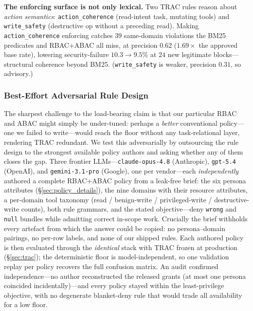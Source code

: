 \documentclass[sigconf,review,anonymous]{acmart}
\begin{document}
\textbf{The enforcing surface is not only lexical.} Two TRAC rules reason about \emph{action semantics}: \texttt{action\_coherence} (read-intent task, mutating tools) and \texttt{write\_safety} (destructive op without a preceding read). Making \texttt{action\_coherence} enforcing catches $39$ same-domain violations the BM25 predicates and RBAC$+$ABAC all miss, at precision $0.62$ ($1.69\times$ the approved base rate), lowering security-failure $10.3\!\to\!9.5\%$ at $24$ new legitimate blocks---structural coherence beyond BM25. (\texttt{write\_safety} is weaker, precision $0.31$, so advisory.)

\subsubsection{Best-Effort Adversarial Rule Design}
\label{sec:llm_authored}

The sharpest challenge to the load-bearing claim is that our particular RBAC and ABAC might simply be under-tuned: perhaps a \emph{better} conventional policy---one we failed to write---would reach the floor without any task-relational layer, rendering TRAC redundant. We test this adversarially by outsourcing the rule design to the strongest available policy authors and asking whether any of them closes the gap. Three frontier LLMs---\texttt{claude-opus-4.8} (Anthropic), \texttt{gpt-5.4} (OpenAI), and \texttt{gemini-3.1-pro} (Google), one per vendor---each \emph{independently} authored a complete RBAC$+$ABAC policy from a leak-free brief: the six persona attributes (\S\ref{sec:policy_details}), the nine domains with their resource attributes, a per-domain tool taxonomy (read / benign-write / privileged-write / destructive-write counts), both rule grammars, and the stated objective---deny \texttt{wrong} and \texttt{null} bundles while admitting correct in-scope work. Crucially the brief withholds every artefact from which the answer could be copied: no persona--domain pairings, no per-row labels, and none of our shipped rules. Each authored policy is then evaluated through the \emph{identical} stack with TRAC frozen at production (\S\ref{sec:trac}); the deterministic floor is model-independent, so one validation replay per policy recovers the full confusion matrix. An audit confirmed independence---no author reconstructed the released grants (at most one persona coincided incidentally)---and every policy stayed within the least-privilege objective, with no degenerate blanket-deny rule that would trade all availability for a low floor.
\end{document}
